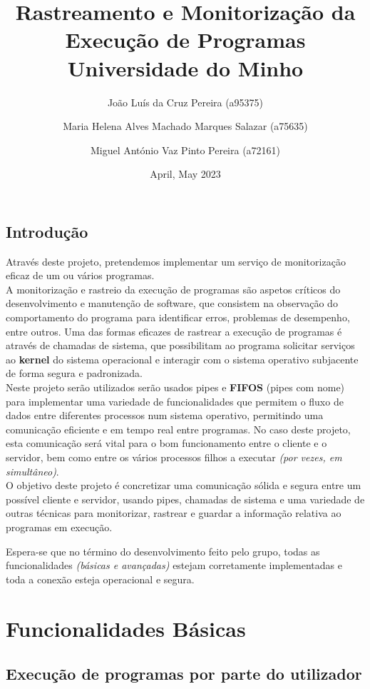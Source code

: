 \documentclass{report}
\title{Rastreamento e Monitorização da Execução de Programas\\
\Large Universidade do Minho}
\author{João Luís da Cruz Pereira (a95375) \and
Maria Helena Alves Machado Marques Salazar (a75635) \and
Miguel António Vaz Pinto Pereira (a72161)\\}
\date{April, May 2023}
\begin{document}

\maketitle
\tableofcontents
\newpage
\section*{Introdução}
Através deste projeto, pretendemos implementar um serviço de monitorização eficaz de um ou vários programas.\\

A monitorização e rastreio da execução de programas são aspetos críticos do desenvolvimento e manutenção de software, que consistem na observação do comportamento do programa para identificar erros, problemas de desempenho, entre outros. Uma das formas eficazes de rastrear a execução de programas é através de chamadas de sistema, que possibilitam ao programa solicitar serviços ao \textbf{kernel} do sistema operacional e interagir com o sistema operativo subjacente de forma segura e padronizada.\\

Neste projeto serão utilizados serão usados pipes e \textbf{FIFOS} (pipes com nome) para implementar uma variedade de funcionalidades que permitem o fluxo de dados entre diferentes processos num sistema operativo, permitindo uma comunicação eficiente e em tempo real entre programas. No caso deste projeto, esta comunicação será vital para o bom funcionamento entre o cliente e o servidor, bem como entre os vários processos filhos a executar \textit{(por vezes, em simultâneo)}.\\

O objetivo deste projeto é concretizar uma comunicação sólida e segura entre um possível cliente e servidor, usando pipes, chamadas de sistema e uma variedade de outras técnicas para monitorizar, rastrear e guardar a informação relativa ao programas em execução.\par 
Espera-se que no término do desenvolvimento feito pelo grupo, todas as funcionalidades \textit{(básicas e avançadas)} estejam corretamente implementadas e toda a conexão esteja operacional e segura.

\newpage
\chapter{Funcionalidades Básicas}
\section{Execução de programas por parte do utilizador}
\end{document}
